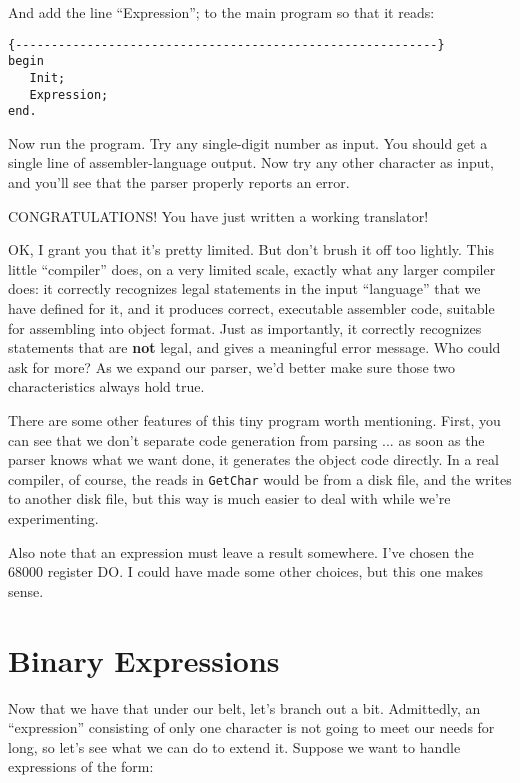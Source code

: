And add the line  ``Expression'';  to  the main program
so that it reads:


\begin{verbatim}
{-----------------------------------------------------------}
begin
   Init;
   Expression;
end.
\end{verbatim}

Now  run  the  program. Try any single-digit number as input. You should get a single line of assembler-language output. Now try any  other character as input, and you'll  see  that  the  parser properly reports an error.

CONGRATULATIONS! You have just written a working translator!

OK, I grant you that it's pretty limited. But don't brush  it off too  lightly. This little ``compiler'' does, on  a  very  limited scale, exactly  what  any larger compiler does:    it  correctly recognizes legal  statements in the input ``language'' that we have defined for it, and  it  produces  correct, executable assembler code, suitable  for  assembling  into  object  format. Just  as importantly, it correctly  recognizes  statements  that  are {\bfseries not} legal, and gives a  meaningful  error message. Who could ask for more?  As we expand our  parser, we'd better make sure those two characteristics always hold true.

There  are  some  other  features  of  this  tiny  program  worth mentioning. First, you  can  see that we don't separate  code generation from parsing ... as  soon as the parser knows what we want  done, it generates the object code directly. In  a  real compiler, of course, the reads in {\tt GetChar} would be  from  a  disk file, and the writes to another  disk  file, but this way is much easier to deal with while we're experimenting.

Also note that an expression must leave a result somewhere. I've chosen the  68000  register DO. I  could have made some other choices, but this one makes sense.

\section{Binary Expressions}

Now that we have that under our belt, let's  branch  out  a bit. Admittedly, an ``expression'' consisting of only  one  character is not going to meet our needs for long, so let's see what we can do to extend it. Suppose we want to handle expressions of the form:

